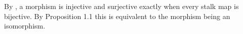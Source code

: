 By , a morphism is injective and surjective exactly when every stalk map is bijective. By Proposition 1.1 this is equivalent to the morphism being an isomorphism.

